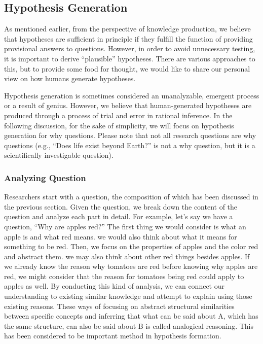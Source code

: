 \documentclass{book}
\begin{document}
\subsection{Hypothesis Generation}
As mentioned earlier, from the perspective of knowledge production, we believe that hypotheses are sufficient in principle if they fulfill the function of providing provisional answers to questions. However, in order to avoid unnecessary testing, it is important to derive ``plausible'' hypotheses. There are various approaches to this, but to provide some food for thought, we would like to share our personal view on how humans generate hypotheses.

Hypothesis generation is sometimes considered an unanalyzable, emergent process or a result of genius. However, we believe that human-generated hypotheses are produced through a process of trial and error in rational inference. In the following discussion, for the sake of simplicity, we will focus on hypothesis generation for why questions. Please note that not all research questions are why questions (e.g., ``Does life exist beyond Earth?'' is not a why question, but it is a scientifically investigable question).

\subsubsection{Analyzing Question}
Researchers start with a question, the composition of which has been discussed in the previous section. Given the question, we break down the content of the question and analyze each part in detail. For example, let's say we have a question, ``Why are apples red?'' The first thing we would consider is what an apple is and what red means. we would also think about what it means for something to be red. Then, we focus on the properties of apples and the color red and abstract them. we may also think about other red things besides apples. If we already know the reason why tomatoes are red before knowing why apples are red, we might consider that the reason for tomatoes being red could apply to apples as well. By conducting this kind of analysis, we can connect our understanding to existing similar knowledge and attempt to explain using those existing reasons. These ways of focusing on abstract structural similarities between specific concepts and inferring that what can be said about A, which has the same structure, can also be said about B is called analogical reasoning. This has been considered to be important method in hypothesis formation.
\end{document}

